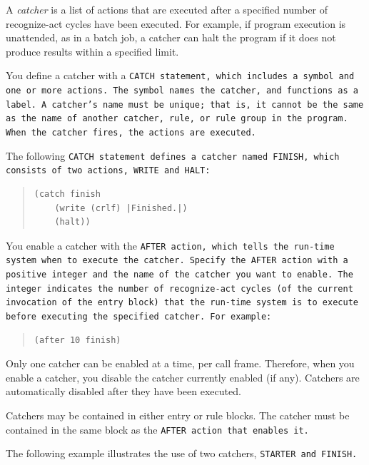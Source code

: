 A \emph{catcher} is a list of actions that are executed after a
specified number of recognize-act cycles have been executed. For
example, if program execution is unattended, as in a batch job, a
catcher can halt the program if it does not produce results within a
specified limit.

You define a catcher with a \tt{CATCH} statement, which includes a
symbol and one or more actions. The symbol names the catcher, and
functions as a label. A catcher's name must be unique; that is, it
cannot be the same as the name of another catcher, rule, or rule group
in the program. When the catcher fires, the actions are executed.

The following \tt{CATCH} statement defines a catcher named
\tt{FINISH}, which consists of two actions, \tt{WRITE} and \tt{HALT}:

\begin{quote}
\begin{verbatim}
(catch finish
    (write (crlf) |Finished.|)
    (halt))
\end{verbatim}
\end{quote}

You enable a catcher with the \tt{AFTER} action, which tells the
run-time system when to execute the catcher. Specify the \tt{AFTER}
action with a positive integer and the name of the catcher you want to
enable. The integer indicates the number of recognize-act cycles (of
the current invocation of the entry block) that the run-time system is
to execute before executing the specified catcher. For example:

\begin{quote}
\begin{verbatim}
(after 10 finish)
\end{verbatim}
\end{quote}

Only one catcher can be enabled at a time, per call frame. Therefore,
when you enable a catcher, you disable the catcher currently enabled
(if any). Catchers are automatically disabled after they have been
executed.

Catchers may be contained in either entry or rule blocks. The catcher
must be contained in the same block as the \tt{AFTER} action that
enables it.

The following example illustrates the use of two catchers,
\tt{STARTER} and \tt{FINISH}.

